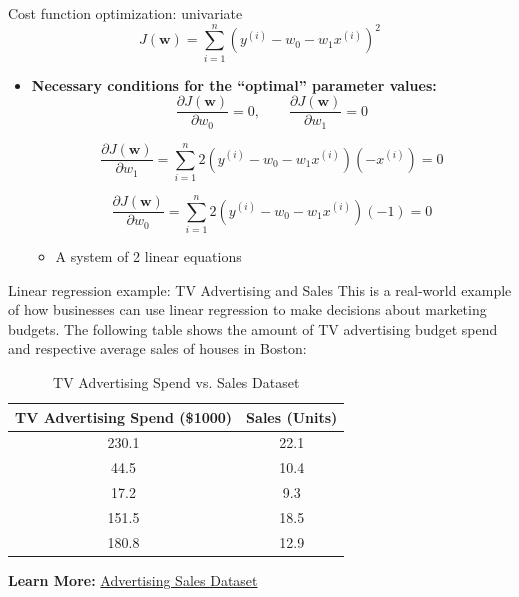 \documentclass[serif, aspectratio=169]{beamer}
\begin{document}
\begin{frame}{Cost function optimization: univariate}
    \[
    J(\mathbf{w}) = \sum_{i=1}^{n} \left( y^{(i)} - w_0 - w_1 x^{(i)} \right)^2
    \]
    
    \begin{itemize}
        \item \textbf{Necessary conditions for the “optimal” parameter values:}
        \[
        \frac{\partial J(\mathbf{w})}{\partial w_0} = 0, \qquad
        \frac{\partial J(\mathbf{w})}{\partial w_1} = 0
        \]
     
    \[
    \frac{\partial J(\mathbf{w})}{\partial w_1} = \sum_{i=1}^{n} 2 \left( y^{(i)} - w_0 - w_1 x^{(i)} \right) (-x^{(i)}) = 0
    \]
    
    \[
    \frac{\partial J(\mathbf{w})}{\partial w_0} = \sum_{i=1}^{n} 2 \left( y^{(i)} - w_0 - w_1 x^{(i)} \right) (-1) = 0
    \]
    
    \begin{itemize}
        \item A system of 2 linear equations
    \end{itemize}
    \end{itemize}
    

\end{frame}





\begin{frame}{Linear regression example: TV Advertising and Sales}
    This is a real-world example of how businesses can use linear regression to make decisions about marketing budgets. The following table shows the amount of TV advertising budget spend and respective average sales of houses in Boston:
    \begin{table}[h!]
    \centering
    \begin{tabular}{|c|c|}
    \hline
    \textbf{TV Advertising Spend (\$1000)} & \textbf{Sales (Units)} \\ \hline
    230.1                                  & 22.1                   \\ \hline
    44.5                                   & 10.4                   \\ \hline
    17.2                                   & 9.3                    \\ \hline
    151.5                                  & 18.5                   \\ \hline
    180.8                                  & 12.9                   \\ \hline
    \end{tabular}
    \caption{TV Advertising Spend vs. Sales Dataset}
    \end{table}
    
\textbf{Learn More:}
\href{https://www.kaggle.com/datasets/yasserh/advertising-sales-dataset}{Advertising Sales Dataset}
\end{frame}
\end{document}
